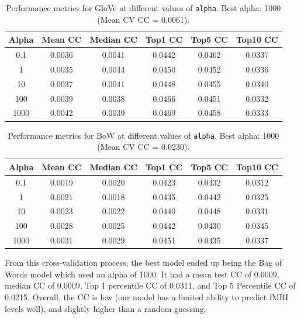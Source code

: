 \documentclass[10pt,letterpaper]{article}
\begin{document}
\begin{table}[ht]
\centering
\caption{Performance metrics for GloVe at different values of \texttt{alpha}. 
Best alpha: 1000 (Mean CV CC = 0.0061).}
\label{tab:glove_cv}
\begin{tabular}{cccccc}
\toprule
\textbf{Alpha} & \textbf{Mean CC} & \textbf{Median CC} & \textbf{Top1 CC} & \textbf{Top5 CC} & \textbf{Top10 CC} \\
\midrule
0.1   & 0.0036 & 0.0041 & 0.0442 & 0.0462 & 0.0337 \\
1     & 0.0035 & 0.0044 & 0.0450 & 0.0452 & 0.0336 \\
10    & 0.0037 & 0.0041 & 0.0448 & 0.0455 & 0.0340 \\
100   & 0.0039 & 0.0038 & 0.0466 & 0.0451 & 0.0332 \\
1000  & 0.0042 & 0.0039 & 0.0469 & 0.0458 & 0.0333 \\
\bottomrule
\end{tabular}
\end{table}


\begin{table}[ht]
\centering
\caption{Performance metrics for BoW at different values of \texttt{alpha}. 
Best alpha: 1000 (Mean CV CC = 0.0230).}
\label{tab:bow_cv}
\begin{tabular}{cccccc}
\toprule
\textbf{Alpha} & \textbf{Mean CC} & \textbf{Median CC} & \textbf{Top1 CC} & \textbf{Top5 CC} & \textbf{Top10 CC} \\
\midrule
0.1   & 0.0019 & 0.0020 & 0.0423 & 0.0432 & 0.0312 \\
1     & 0.0021 & 0.0018 & 0.0435 & 0.0442 & 0.0325 \\
10    & 0.0023 & 0.0022 & 0.0440 & 0.0448 & 0.0331 \\
100   & 0.0028 & 0.0025 & 0.0442 & 0.0430 & 0.0345 \\
1000  & 0.0031 & 0.0029 & 0.0451 & 0.0435 & 0.0337 \\
\bottomrule
\end{tabular}
\end{table}

From this cross-validation process, the best model ended up being the Bag of Words model which used an alpha of 1000. It had a mean test CC of 0.0009, median CC of 0.0009, Top 1 percentile CC of 0.0311, and Top 5 Percentile CC of 0.0215. Overall, the CC is low (our model has a limited ability to predict fMRI levels well), and slightly higher than a random guessing.
\end{document}
